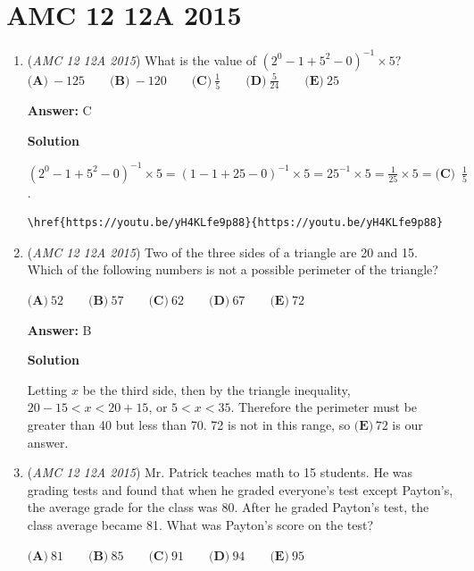 \section{AMC 12 12A 2015}
        \begin{enumerate}
        	\item (\textit{AMC 12 12A 2015}) What is the value of $(2^0-1+5^2-0)^{-1}\times5?$
$\textbf{(A)}\ -125\qquad\textbf{(B)}\ -120\qquad\textbf{(C)}\ \frac{1}{5}\qquad\textbf{(D)}\ \frac{5}{24}\qquad\textbf{(E)}\ 25$

 \textbf{Answer: }C



\textbf{Solution}

$(2^0-1+5^2-0)^{-1}\times5 = (1-1+25-0)^{-1} \times 5 = 25^{-1} \times 5 = \frac{1}{25} \times 5 = \boxed{\textbf{(C) } \, \frac{1}{5}}$.

 \begin{verbatim}
\href{https://youtu.be/yH4KLfe9p88}{https://youtu.be/yH4KLfe9p88}
\end{verbatim}





	\item (\textit{AMC 12 12A 2015}) Two of the three sides of a triangle are 20 and 15. Which of the following numbers is not a possible perimeter of the triangle?


 $\textbf{(A)}\ 52\qquad\textbf{(B)}\ 57\qquad\textbf{(C)}\ 62\qquad\textbf{(D)}\ 67\qquad\textbf{(E)}\ 72$

 \textbf{Answer: }B



\textbf{Solution}

Letting $x$ be the third side, then by the triangle inequality, $20-15 < x < 20+15$, or $5 < x < 35$. Therefore the perimeter must be greater than 40 but less than 70. 72 is not in this range, so $\boxed{\textbf{(E)} \, 72}$ is our answer.

 


	\item (\textit{AMC 12 12A 2015}) Mr. Patrick teaches math to 15 students. He was grading tests and found that when he graded everyone's test except Payton's, the average grade for the class was 80. After he graded Payton's test, the class average became 81. What was Payton's score on the test?


 $\textbf{(A)}\ 81\qquad\textbf{(B)}\ 85\qquad\textbf{(C)}\ 91\qquad\textbf{(D)}\ 94\qquad\textbf{(E)}\ 95$


\end{enumerate}
